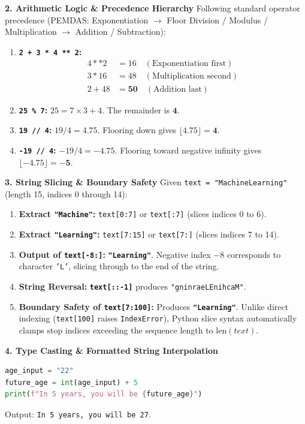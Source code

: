 \textbf{2. Arithmetic Logic \& Precedence Hierarchy}
Following standard operator precedence (PEMDAS: Exponentiation $\to$ Floor Division / Modulus / Multiplication $\to$ Addition / Subtraction):
\begin{enumerate}
    \item \textbf{\texttt{2 + 3 * 4 ** 2}:}
    \begin{align*}
    4 ** 2 &= 16 \quad (\text{Exponentiation first}) \\
    3 * 16 &= 48 \quad (\text{Multiplication second}) \\
    2 + 48 &= \mathbf{50} \quad (\text{Addition last})
    \end{align*}
    \item \textbf{\texttt{25 \% 7}:}
    $25 = 7 \times 3 + 4$. The remainder is $\mathbf{4}$.
    \item \textbf{\texttt{19 // 4}:}
    $19 / 4 = 4.75$. Flooring down gives $\lfloor 4.75 \rfloor = \mathbf{4}$.
    \item \textbf{\texttt{-19 // 4}:}
    $-19 / 4 = -4.75$. Flooring toward negative infinity gives $\lfloor -4.75 \rfloor = \mathbf{-5}$.
\end{enumerate}

\textbf{3. String Slicing \& Boundary Safety}
Given \texttt{text = "MachineLearning"} (length 15, indices 0 through 14):
\begin{enumerate}
    \item \textbf{Extract \texttt{"Machine"}:} \texttt{text[0:7]} or \texttt{text[:7]} (slices indices 0 to 6).
    \item \textbf{Extract \texttt{"Learning"}:} \texttt{text[7:15]} or \texttt{text[7:]} (slices indices 7 to 14).
    \item \textbf{Output of \texttt{text[-8:]}:} \textbf{\texttt{"Learning"}}. Negative index $-8$ corresponds to character \texttt{'L'}, slicing through to the end of the string.
    \item \textbf{String Reversal:} \textbf{\texttt{text[::-1]}} produces \texttt{"gninraeLEnihcaM"}.
    \item \textbf{Boundary Safety of \texttt{text[7:100]}:} Produces \textbf{\texttt{"Learning"}}.
    Unlike direct indexing (\texttt{text[100]} raises \texttt{IndexError}), Python slice syntax automatically clamps stop indices exceeding the sequence length to $\text{len}(text)$.
\end{enumerate}

\textbf{4. Type Casting \& Formatted String Interpolation}
\begin{lstlisting}[language=Python]
age_input = "22"
future_age = int(age_input) + 5
print(f"In 5 years, you will be {future_age}")
\end{lstlisting}
Output: \texttt{In 5 years, you will be 27}.

